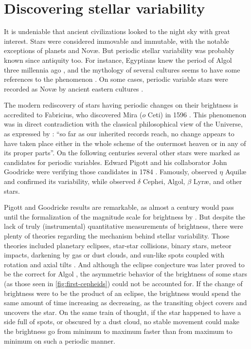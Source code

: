 \section{Discovering stellar variability \label{sec:intro-stellar-variability}}


It is undeniable that ancient civilizations looked to the night sky with great interest. 
Stars were considered immovable and immutable, with the notable exceptions of planets and Nov\ae{}.
But periodic stellar variability was probably known since antiquity too.
For instance, Egyptians knew the period of Algol three millennia ago \citep{Jetsu2013,Jetsu2015},
and the mythology of several cultures seems to have some references to the phenomenon \citep{Wilk1996}. 
On some cases, periodic variable stars were recorded as Nov\ae{} by ancient eastern cultures \citep{HOPENGYOKE1962}.


The modern rediscovery of stars having periodic changes on their brightness is accredited to Fabricius, 
who discovered Mira ($o$ Ceti) in 1596 \citep{Hoffleit1997}.
This phenomenon was in direct contradiction with the classical philosophical view of the Universe, as expressed by \citet[book I, part 3]{aristotle}: 
\enquote{so far as our inherited records reach, no change appears to have taken place either in the whole scheme of the outermost heaven or in any of its proper parts}.
On the following centuries several other stars were marked as candidates for periodic variables.
Edward Pigott and his collaborator John Goodricke were verifying those candidates in 1784 \citep{Hoskin1979}. 
Famously, \cite{Pigott1785} observed $\eta$ Aquil\ae{} and confirmed its variability, 
while \cite{Goodricke1786} observed $\delta$ Cephei, Algol, $\beta$ Lyr\ae{}, and other stars.



Pigott and Goodricke results are remarkable, as almost a century would pass until the formalization of the magnitude scale for brightness by \cite{Pogson1856}.
But despite the lack of truly (instrumental) quantitative measurements of brightness, 
there were plenty of theories regarding the mechanism behind stellar variability. 
Those theories included planetary eclipses, star-star collisions, binary stars, meteor impacts, 
darkening by gas or dust clouds, and sun-like spots coupled with rotation and axial tilts \citep{Hoffleit1993}. 
And although the eclipse conjecture was later proved to be the correct for Algol \citep{Pickering1880}, 
the asymmetric behavior of the brightness of some stars (as those seen in \autoref{fig:first-cepheids}) could not be accounted for.
If the change of brightness were to be the product of an eclipse,
the brightness would spend the same amount of time increasing as decreasing,
as the transiting object covers and uncovers the star.
On the same train of thought, if the star happened to have a side full of spots, or obscured by a dust cloud,
no stable movement could make the brightness go from minimum to maximum faster than from maximum to minimum on such a periodic manner.

